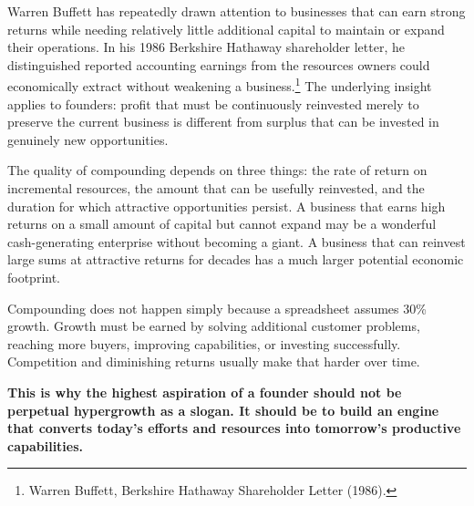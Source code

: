 Warren Buffett has repeatedly drawn attention to businesses that can earn strong returns while needing relatively little additional capital to maintain or expand their operations. In his 1986 Berkshire Hathaway shareholder letter, he distinguished reported accounting earnings from the resources owners could economically extract without weakening a business.\footnote{Warren Buffett, Berkshire Hathaway Shareholder Letter (1986).} The underlying insight applies to founders: profit that must be continuously reinvested merely to preserve the current business is different from surplus that can be invested in genuinely new opportunities.

The quality of compounding depends on three things: the rate of return on incremental resources, the amount that can be usefully reinvested, and the duration for which attractive opportunities persist. A business that earns high returns on a small amount of capital but cannot expand may be a wonderful cash-generating enterprise without becoming a giant. A business that can reinvest large sums at attractive returns for decades has a much larger potential economic footprint.

Compounding does not happen simply because a spreadsheet assumes 30\% growth. Growth must be earned by solving additional customer problems, reaching more buyers, improving capabilities, or investing successfully. Competition and diminishing returns usually make that harder over time.

\textbf{This is why the highest aspiration of a founder should not be perpetual hypergrowth as a slogan. It should be to build an engine that converts today's efforts and resources into tomorrow's productive capabilities.}
